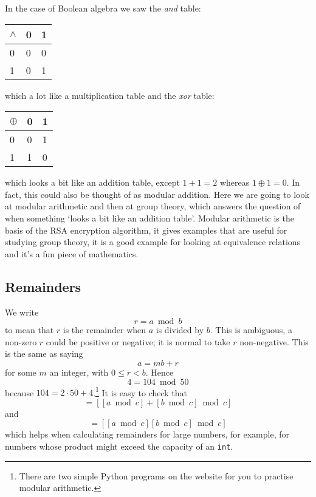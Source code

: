 \documentclass[12pt]{article}
\begin{document}
In the case of Boolean algebra we saw the \emph{and} table:\\
\begin{center}
\begin{tabular}{l|ll}
$\land$&0&1\\
\hline
0   &0&0\\
1   &0&1\\
\end{tabular}
\end{center}
which a lot like a multiplication table and the \emph{xor} table:\\
\begin{center}
\begin{tabular}{l|ll}
$\oplus$&0&1\\
\hline
0   &0&1\\
1   &1&0\\
\end{tabular}
\end{center}
which looks a bit like an addition table, except $1+1=2$ whereas
$1\oplus 1=0$. In fact, this could also be thought of as modular
addition. Here we are going to look at modular arithmetic and then at
group theory, which answers the question of when something \lq{}looks
a bit like an addition table\rq{}. Modular arithmetic is the basis of
the RSA encryption algorithm, it gives examples that are useful for
studying group theory, it is a good example for looking at equivalence
relations and it's a fun piece of mathematics.

\subsection*{Remainders}

We write
\begin{equation}
r=a \bmod b
\end{equation}
to mean that $r$ is the remainder when $a$ is divided by $b$. This is
ambiguous, a non-zero $r$ could be positive or negative; it is normal
to take $r$ non-negative. This is the same as saying
\begin{equation}
a=mb+r
\end{equation}
for some $m$ an integer, with $0\le r<b$. Hence
\begin{equation}
4=104 \bmod 50
\end{equation}
because $104=2\cdot 50+4$.\footnote{There are two simple Python programs
  on the website for you to practise modular arithmetic.} \HandRight{} It is easy
to check that 
\begin{equation}
[a+b\bmod{c}]=[[a \bmod{c}]+[b \bmod{c}] \bmod{c}]
\end{equation}
and
\begin{equation}
[ab\bmod{c}]=[[a \bmod{c}][b \bmod{c}] \bmod{c}]
\end{equation}
which helps when calculating remainders for large numbers, for
example, for numbers whose product might exceed the capacity of an
\texttt{int}.
\end{document}
